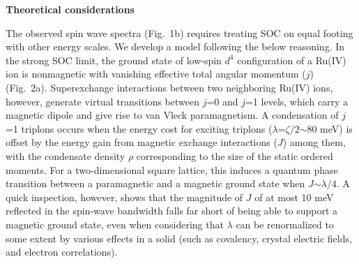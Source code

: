 \vspace{ 10 pt}
\noindent
{\bf Theoretical considerations}

\noindent
The observed spin wave spectra (Fig.~1b) requires treating SOC on equal footing with other energy scales. We develop a model following the below reasoning. In the strong SOC limit, the ground state of low-spin $d^4$ configuration of a Ru(IV) ion is nonmagnetic with vanishing effective total angular momentum ($j$) (Fig.~2a)\cite{Khaliullin_2013}. Superexchange interactions between two neighboring Ru(IV) ions, however, generate virtual transitions between $j$=0 and $j$=1 levels, which carry a magnetic dipole and give rise to van Vleck paramagnetism\cite{Khaliullin_2013}. A condensation of $j$=1 triplons occurs when the energy cost for exciting triplons ($\lambda$=$\zeta/2$$\sim$80 meV) is offset by the energy gain from magnetic exchange interactions ($J$) among them, with the condensate density $\rho$ corresponding to the size of the static ordered moments. For a two-dimensional square lattice, this induces a quantum phase transition between a paramagnetic and a magnetic ground state when $J$$\sim$$\lambda/4$. A quick inspection, however, shows that the magnitude of $J$ of at most 10 meV reflected in the spin-wave bandwidth falls far short of being able to support a magnetic ground state, even when considering that $\lambda$ can be renormalized to some extent by various effects in a solid (such as covalency, crystal electric fields, and electron correlations). 

